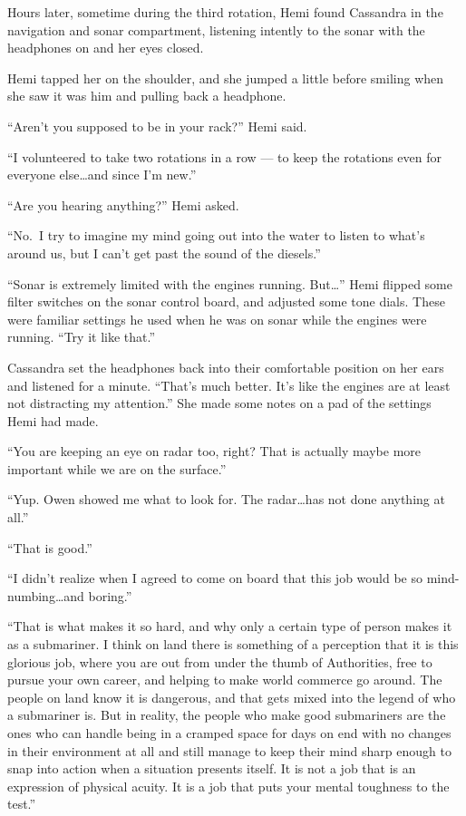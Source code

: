 \documentclass[
]{scrbook}
\begin{document}
\bigskip

Hours later, sometime during the third rotation, Hemi found Cassandra in
the navigation and sonar compartment, listening intently to the sonar
with the headphones on and her eyes closed.

Hemi tapped her on the shoulder, and she jumped a little before smiling
when she saw it was him and pulling back a headphone.

``Aren't you supposed to be in your rack?'' Hemi said.

``I volunteered to take two rotations in a row --- to keep the rotations
even for everyone else\ldots and since I'm new.''

``Are you hearing anything?'' Hemi asked.

``No.~I try to imagine my mind going out into the water to listen to
what's around us, but I can't get past the sound of the diesels.''

``Sonar is extremely limited with the engines running. But\ldots{}''
Hemi flipped some filter switches on the sonar control board, and
adjusted some tone dials. These were familiar settings he used when he
was on sonar while the engines were running. ``Try it like that.''

Cassandra set the headphones back into their comfortable position on her
ears and listened for a minute. ``That's much better. It's like the
engines are at least not distracting my attention.'' She made some notes
on a pad of the settings Hemi had made.

``You are keeping an eye on radar too, right? That is actually maybe
more important while we are on the surface.''

``Yup. Owen showed me what to look for. The radar\ldots has not done
anything at all.''

``That is good.''

``I didn't realize when I agreed to come on board that this job would be
so mind-numbing\ldots and boring.''

``That is what makes it so hard, and why only a certain type of person
makes it as a submariner. I think on land there is something of a
perception that it is this glorious job, where you are out from under
the thumb of Authorities, free to pursue your own career, and helping to
make world commerce go around. The people on land know it is dangerous,
and that gets mixed into the legend of who a submariner is. But in
reality, the people who make good submariners are the ones who can
handle being in a cramped space for days on end with no changes in their
environment at all and still manage to keep their mind sharp enough to
snap into action when a situation presents itself. It is not a job that
is an expression of physical acuity. It is a job that puts your mental
toughness to the test.''
\end{document}
